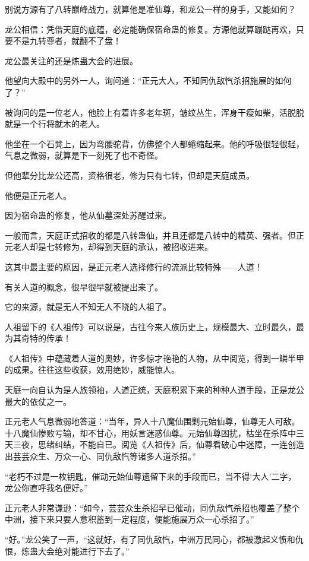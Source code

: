 \begin{this_body}
别说方源有了八转巅峰战力，就算他是准仙尊，和龙公一样的身手，又能如何？

龙公相信：凭借天庭的底蕴，必定能确保宿命蛊的修复。方源他就算蹦跶再欢，只要不是九转尊者，就翻不了盘！

龙公最关注的还是炼蛊大会的进展。

他望向大殿中的另外一人，询问道：“正元大人，不知同仇敌忾杀招施展的如何了？”

被询问的是一位老人，他脸上有着许多老年斑，皱纹丛生，浑身干瘦如柴，活脱脱就是一个行将就木的老人。

他坐在一个石凳上，因为弯腰驼背，仿佛整个人都蜷缩起来。他的呼吸很轻很轻，气息之微弱，就算是下一刻死了也不奇怪。

但他辈分比龙公还高，资格很老，修为只有七转，但却是天庭成员。

他便是正元老人。

因为宿命蛊的修复，他从仙墓深处苏醒过来。

一般而言，天庭正式招收的都是八转蛊仙，并且还都是八转中的精英、强者。但正元老人却是七转修为，却得到天庭的承认，被招收进来。

这其中最主要的原因，是正元老人选择修行的流派比较特殊——人道！

有关人道的概念，很早很早就被提出来了。

它的来源，就是无人不知无人不晓的人祖了。

人祖留下的《人祖传》可以说是，古往今来人族历史上，规模最大、立时最久，最为其奇特的传承！

《人祖传》中蕴藏着人道的奥妙，许多惊才艳艳的人物，从中阅览，得到一鳞半甲的成果。往往这些收获，效用绝妙，威能惊人。

天庭一向自认为是人族领袖，人道正统，天庭积累下来的种种人道手段，正是龙公最大的依仗之一。

正元老人气息微弱地答道：“当年，异人十八魔仙围剿元始仙尊，仙尊无人可敌。十八魔仙惨败亏输，却不甘心，用妖言迷惑仙尊。元始仙尊困扰，枯坐在杀阵中三天三夜，思绪纠结，不能自已。阅览《人祖传》后，仙尊看破心中迷障，一连创造出芸芸众生、万众一心、同仇敌忾等诸多人道杀招。”

“老朽不过是一枚钥匙，催动元始仙尊遗留下来的手段而已，当不得‘大人’二字，龙公你直呼我名便好。”

正元老人非常谦逊：“如今，芸芸众生杀招早已催动，同仇敌忾杀招也覆盖了整个中洲，接下来只要人意积蓄到一定程度，便能施展万众一心杀招了。”

“好。”龙公笑了一声，“这就好，有了同仇敌忾，中洲万民同心，都被激起义愤和仇恨，炼蛊大会绝对能进行下去了。”


\end{this_body}
